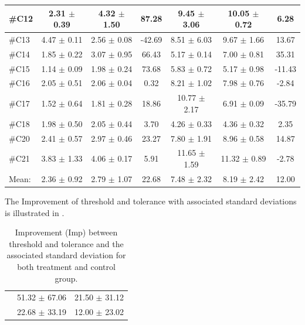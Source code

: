 \begin{longtable} {l|c|c|c|c|c|c}
\#C12 & 2.31 $\pm$ 0.39 & 4.32 $\pm$ 1.50 & 87.28 	& 9.45 $\pm$ 3.06 & 10.05 $\pm$ 0.72 & 6.28 \\ \hline
\#C13 & 4.47 $\pm$ 0.11 & 2.56 $\pm$	0.08 & -42.69 & 8.51 $\pm$ 6.03 & 9.67 $\pm$  1.66 & 13.67 \\ \hline
\#C14 & 1.85 $\pm$ 0.22 & 3.07 $\pm$ 0.95 & 66.43	 & 5.17 $\pm$ 0.14  & 7.00 $\pm$ 0.81 & 35.31 \\ \hline
\#C15 & 1.14 $\pm$ 0.09 & 1.98 $\pm$ 0.24 & 73.68 & 5.83 $\pm$ 0.72 & 5.17 $\pm$ 0.98 & -11.43 \\ \hline
\#C16 & 2.05 $\pm$ 0.51 & 2.06 $\pm$ 0.04 & 0.32 & 8.21 $\pm$ 1.02 & 7.98 $\pm$ 0.76 & -2.84 \\ \hline
\#C17 & 1.52 $\pm$ 0.64 & 1.81 $\pm$ 0.28 & 18.86 & 10.77 $\pm$ 2.17 & 6.91 $\pm$ 0.09 & -35.79 \\ \hline
\#C18 & 1.98  $\pm$ 0.50 & 2.05 $\pm$ 0.44 & 3.70 & 4.26  $\pm$ 0.33 &  4.36 $\pm$  0.32 & 2.35 \\ \hline
\#C20 & 2.41 $\pm$  0.57 & 2.97 $\pm$ 0.46 & 23.27  & 7.80 $\pm$ 1.91  &  8.96 $\pm$ 0.58 & 14.87 \\ \hline
\#C21 & 3.83 $\pm$ 1.33 & 4.06 $\pm$  0.17 & 5.91 & 11.65 $\pm$ 1.59  & 11.32 $\pm$ 0.89 & -2.78 \\ \hline
Mean: & 2.36 $\pm$ 0.92 & 2.79 $\pm$ 1.07 & 22.68 & 7.48 $\pm$ 2.32 & 8.19 $\pm$ 2.42 & 12.00 \\ \hline 
\end{longtable}

The Improvement of threshold and tolerance with associated standard deviations is illustrated in .

\begin{longtable} {l|c|c}
	\caption{Improvement (Imp) between threshold and tolerance and the associated standard deviation for both treatment and control group.}
	\label{tab:Total} \\
\cellcolor[HTML]{C0C0C0}{} &
 \cellcolor[HTML]{C0C0C0}{\textbf{Threshold Imp [\%]}} &  \cellcolor[HTML]{C0C0C0}{\textbf{Tolerance Imp[\%]}} \\ \hline
\cellcolor[HTML]{C0C0C0}{\textbf{Treatment}} & 51.32 $\pm$ 67.06 & 21.50 $\pm$ 31.12 \\ \hline
\cellcolor[HTML]{C0C0C0}{\textbf{Control}} & 22.68 $\pm$ 33.19  & 12.00 $\pm$ 23.02 \\ \hline
\end{longtable}
\vspace{-.5cm} 

